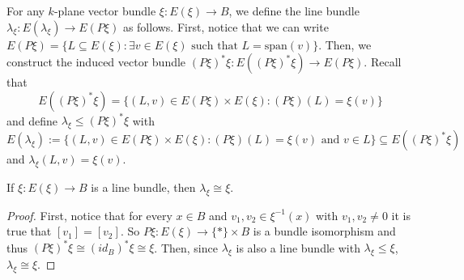 \begin{definition} For any $k$-plane vector bundle $\xi:E(\xi)\to B$, we define the line bundle $\lambda_{\xi}:E(\lambda_\xi)\to E(P\xi)$ as follows. First, notice that we can write $E(P\xi)=\big\{L\subseteq E(\xi):\exists v\in E(\xi)\text{ such that }L=\mathrm{span}(v)\big\}$. Then, we construct the induced vector bundle $(P\xi)^*\xi:E((P\xi)^*\xi)\to E(P\xi)$. Recall that
\[E((P\xi)^*\xi)=\big\{(L,v)\in E(P\xi)\times E(\xi):(P\xi)(L)=\xi(v)\big\}\]
and define $\lambda_{\xi}\leq(P\xi)^*\xi$ with $E(\lambda_{\xi}):=\big\{(L,v)\in E(P\xi)\times E(\xi):(P\xi)(L)=\xi(v)\text{ and }v\in L\big\}\subseteq E((P\xi)^*\xi)$ and $\lambda_{\xi}(L,v)=\xi(v)$.
\begin{center}
\end{center}
\end{definition}
\begin{remark}\label{rem:lambda_for_line_bundle} If $\xi:E(\xi)\to B$ is a line bundle, then $\lambda_\xi\cong\xi$.
\end{remark}
\begin{proof} First, notice that for every $x\in B$ and $v_1,v_2\in\xi^{-1}(x)$ with $v_1,v_2\neq 0$ it is true that $[v_1]=[v_2]$. So $P\xi:E(\xi)\to \{*\}\times B$ is a bundle isomorphism and thus $(P\xi)^*\xi\cong(id_B)^*\xi\cong\xi$. Then, since $\lambda_{\xi}$ is also a line bundle with $\lambda_{\xi}\leq\xi$, $\lambda_{\xi}\cong\xi$.
\end{proof}

